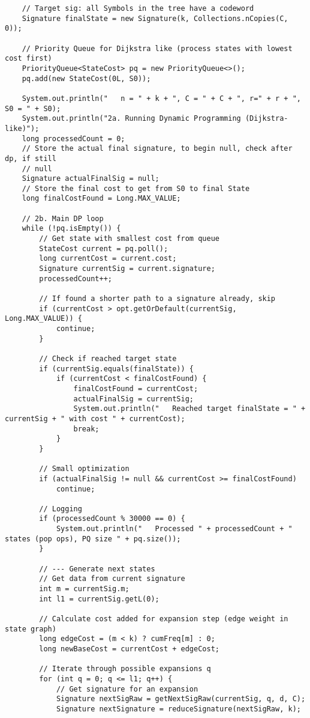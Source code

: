 \documentclass[a4paper,10pt,ngerman]{scrartcl}
\begin{document}
\begin{lstlisting}
    // Target sig: all Symbols in the tree have a codeword
    Signature finalState = new Signature(k, Collections.nCopies(C, 0));

    // Priority Queue for Dijkstra like (process states with lowest cost first)
    PriorityQueue<StateCost> pq = new PriorityQueue<>();
    pq.add(new StateCost(0L, S0));

    System.out.println("   n = " + k + ", C = " + C + ", r=" + r + ", S0 = " + S0);
    System.out.println("2a. Running Dynamic Programming (Dijkstra-like)");
    long processedCount = 0;
    // Store the actual final signature, to begin null, check after dp, if still
    // null
    Signature actualFinalSig = null;
    // Store the final cost to get from S0 to final State
    long finalCostFound = Long.MAX_VALUE;

    // 2b. Main DP loop
    while (!pq.isEmpty()) {
        // Get state with smallest cost from queue
        StateCost current = pq.poll();
        long currentCost = current.cost;
        Signature currentSig = current.signature;
        processedCount++;

        // If found a shorter path to a signature already, skip
        if (currentCost > opt.getOrDefault(currentSig, Long.MAX_VALUE)) {
            continue;
        }

        // Check if reached target state
        if (currentSig.equals(finalState)) {
            if (currentCost < finalCostFound) {
                finalCostFound = currentCost;
                actualFinalSig = currentSig;
                System.out.println("   Reached target finalState = " + currentSig + " with cost " + currentCost);
                break;
            }
        }

        // Small optimization
        if (actualFinalSig != null && currentCost >= finalCostFound)
            continue;

        // Logging
        if (processedCount % 30000 == 0) {
            System.out.println("   Processed " + processedCount + " states (pop ops), PQ size " + pq.size());
        }

        // --- Generate next states
        // Get data from current signature
        int m = currentSig.m;
        int l1 = currentSig.getL(0);

        // Calculate cost added for expansion step (edge weight in state graph)
        long edgeCost = (m < k) ? cumFreq[m] : 0;
        long newBaseCost = currentCost + edgeCost;

        // Iterate through possible expansions q
        for (int q = 0; q <= l1; q++) {
            // Get signature for an expansion
            Signature nextSigRaw = getNextSigRaw(currentSig, q, d, C);
            Signature nextSignature = reduceSignature(nextSigRaw, k);


\end{lstlisting}
\end{document}
